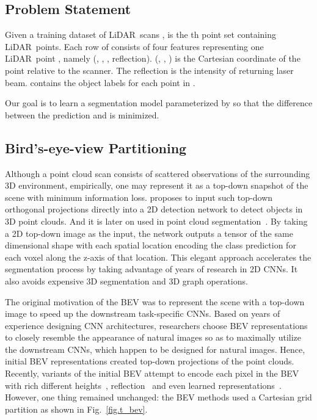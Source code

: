 \documentclass[10pt,twocolumn,letterpaper]{article}
\newcommand{\lidar}{\mbox{LiDAR }}
\begin{document}
\subsection{Problem Statement}

Given a training dataset of  \lidar scans ,  is the th point set containing  \lidar points. Each row of  consists of four features representing one \lidar point , namely (, , , reflection). (, , ) is the Cartesian coordinate of the point relative to the scanner. The reflection is the intensity of returning laser beam.  contains the object labels for each point  in .

Our goal is to learn a segmentation model  parameterized by  so that the difference between the prediction  and  is minimized.


\subsection{Bird's-eye-view Partitioning}

Although a point cloud scan consists of scattered observations of the surrounding 3D environment, empirically, one may represent it as a top-down snapshot of the scene with minimum information loss. \cite{chen2017multi} proposes to input such top-down orthogonal projections directly into a 2D detection network to detect objects in 3D point clouds. And it is later on used in point cloud segmentation~\cite{zhang2018efficient}. By taking a 2D top-down image as the input, the network outputs a tensor of the same dimensional shape with each spatial location encoding the class prediction for each voxel along the z-axis of that location. This elegant approach accelerates the segmentation process by taking advantage of years of research in 2D CNNs. It also avoids expensive 3D segmentation and 3D graph operations.

The original motivation of the BEV was to represent the scene with a top-down image to speed up the downstream task-specific CNNs. Based on years of experience designing CNN architectures, researchers choose BEV representations to closely resemble the appearance of natural images so as to maximally utilize the downstream CNNs, which happen to be designed for natural images. Hence, initial BEV representations created top-down projections of the point clouds. Recently, variants of the initial BEV attempt to encode each pixel in the BEV with rich different heights~\cite{yang2018pixor}, reflection~\cite{simon2018complex} and even learned representations~\cite{lang2019pointpillars}. However, one thing remained unchanged: the BEV methods used a Cartesian grid partition as shown in Fig.~\ref{fig.t_bev}.
\end{document}
